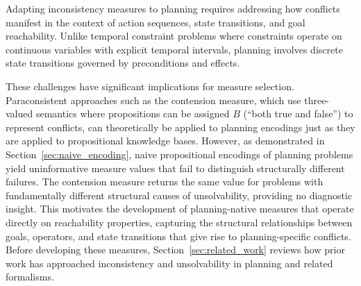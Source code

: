 Adapting inconsistency measures to planning requires addressing how conflicts manifest in the context of action sequences, state transitions, and goal reachability. Unlike temporal constraint problems where constraints operate on continuous variables with explicit temporal intervals, planning involves discrete state transitions governed by preconditions and effects.

These challenges have significant implications for measure selection. Paraconsistent approaches such as the contension measure, which use three-valued semantics where propositions can be assigned $B$ (``both true and false'') to represent conflicts, can theoretically be applied to planning encodings just as they are applied to propositional knowledge bases. However, as demonstrated in Section~\ref{sec:naive_encoding}, naive propositional encodings of planning problems yield uninformative measure values that fail to distinguish structurally different failures. The contension measure returns the same value for problems with fundamentally different structural causes of unsolvability, providing no diagnostic insight. This motivates the development of planning-native measures that operate directly on reachability properties, capturing the structural relationships between goals, operators, and state transitions that give rise to planning-specific conflicts. Before developing these measures, Section~\ref{sec:related_work} reviews how prior work has approached inconsistency and unsolvability in planning and related formalisms.
